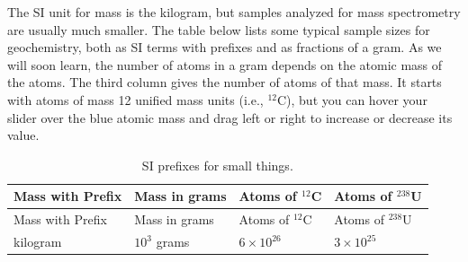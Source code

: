\documentclass[
  letterpaper,
  DIV=11,
  numbers=noendperiod]{scrreprt}
\begin{document}
The SI unit for mass is the kilogram, but samples analyzed for mass
spectrometry are usually much smaller. The table below lists some
typical sample sizes for geochemistry, both as SI terms with prefixes
and as fractions of a gram. As we will soon learn, the number of atoms
in a gram depends on the atomic mass of the atoms. The third column
gives the number of atoms of that mass. It starts with atoms of mass 12
unified mass units (i.e., \(^{12}\)C), but you can hover your slider
over the blue atomic mass and drag left or right to increase or decrease
its value.

\begin{longtable}[]{@{}
  >{\raggedright\arraybackslash}p{}
  >{\raggedright\arraybackslash}p{}
  >{\raggedright\arraybackslash}p{}
  >{\raggedright\arraybackslash}p{}@{}}
\caption{SI prefixes for small things.}\tabularnewline
\toprule\noalign{}
\begin{minipage}[b]{\linewidth}\raggedright
Mass with Prefix
\end{minipage} & \begin{minipage}[b]{\linewidth}\raggedright
Mass in grams
\end{minipage} & \begin{minipage}[b]{\linewidth}\raggedright
Atoms of \(^{12}\)C
\end{minipage} & \begin{minipage}[b]{\linewidth}\raggedright
Atoms of \(^{238}\)U
\end{minipage} \\
\midrule\noalign{}
\endfirsthead
\toprule\noalign{}
\begin{minipage}[b]{\linewidth}\raggedright
Mass with Prefix
\end{minipage} & \begin{minipage}[b]{\linewidth}\raggedright
Mass in grams
\end{minipage} & \begin{minipage}[b]{\linewidth}\raggedright
Atoms of \(^{12}\)C
\end{minipage} & \begin{minipage}[b]{\linewidth}\raggedright
Atoms of \(^{238}\)U
\end{minipage} \\
\midrule\noalign{}
\endhead
\bottomrule\noalign{}
\endlastfoot
kilogram & \(10^3\) grams & \(6 \times 10^{26}\) &
\(3 \times 10^{25}\) \\

\end{longtable}
\end{document}
